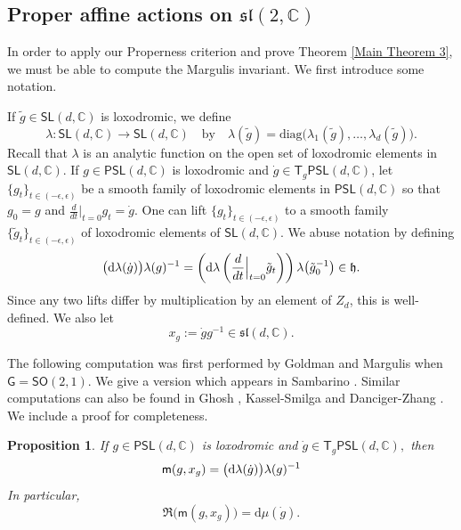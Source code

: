 \documentclass{amsart}
\theoremstyle{plain}
\newtheorem{proposition}{Proposition}[section]
\theoremstyle{definition}
\theoremstyle{remark}
\newcommand{\PSL}{\mathsf{PSL}}
\newcommand{\SL}{\mathsf{SL}}
\renewcommand{\sf}[1]{{\mathsf{#1}}}
\newcommand{\h}{{\mathfrak h}}
\newcommand{\C}{\mathbb C}
\renewcommand{\sl}{\mathfrak{sl}}
\newcommand{\<}{\left <}
\renewcommand{\>}{\right >}
\renewcommand{\C}{\mathbb C}
\newcommand{\dd}{{\mathrm{d}}}
\begin{document}
\subsection{Proper affine actions on $\sl(2,\C)$}
\label{conclusion}
In order to apply our Properness criterion and prove Theorem \ref{Main Theorem 3},
we must be able to compute the Margulis invariant. We first introduce some notation.

If $\tilde g\in \SL(d,\C)$ is loxodromic,  we define 
$$\lambda:\SL(d,\C)\to\SL(d,\C)\quad \text{by}
\quad\lambda(\tilde g)=\mathrm{diag}\big(\lambda_1(\tilde g),\ldots,\lambda_d(\tilde g)\big).$$
Recall that $\lambda$ is an analytic function on the open set of loxodromic elements in $\SL(d,\C)$.
If $g\in\PSL(d,\C)$ is loxodromic and $\dot g\in\sf T_g\PSL(d,\C)$, let $\{g_t\}_{t\in (-\epsilon,\epsilon)}$ be a smooth family of 
loxodromic elements  in $\PSL(d,\C)$ so that $g_0=g$ and $\frac{d}{dt}\big|_{t=0} g_t=\dot g$. One can lift
$\{g_t\}_{t\in (-\epsilon,\epsilon)}$ to a smooth family $\{\tilde g_t\}_{t\in (-\epsilon,\epsilon)}$  of loxodromic elements
of $\SL(d,\C)$. We abuse notation by defining
$$\big({\rm {d}}\lambda(\dot g)\big)\lambda(g)^{-1}=\left({\rm {d}}\lambda\left(\frac{d}{dt}\Big|_{t=0} \tilde g_t\right)\right)\lambda\big(\tilde g_0^{-1}\big)\in\h.$$
Since any two lifts differ by multiplication by an element of $Z_d$, this is well-defined.
We also let
$$x_g:=\dot g g^{-1}\in\sl(d,\C).$$


The following computation was first performed by Goldman and  Margulis \cite{goldman-margulis} when $\sf G=\mathsf{SO}(2,1)$.
We give a version which appears in  Sambarino \cite[Cor. 8.3]{sambarino}. 
Similar computations can also be found in Ghosh \cite{Ghoshdef,avatars}, Kassel-Smilga \cite{KS} and
Danciger-Zhang \cite{DZ}. We include a proof for completeness.



\begin{proposition}
\label{eigenvaluevariation} 
If $g\in\PSL(d,\C)$ is  loxodromic and $\dot g\in\sf T_g\PSL(d,\C),$ then 
$$\sf m(g,x_g)=\big({\rm {d}}\lambda(\dot g)\big)\lambda(g)^{-1}$$
In particular,
 $$\Re\Big(\sf m(g,x_g)\Big)=\dd\mu(\dot g).$$
\end{proposition}
\end{document}
